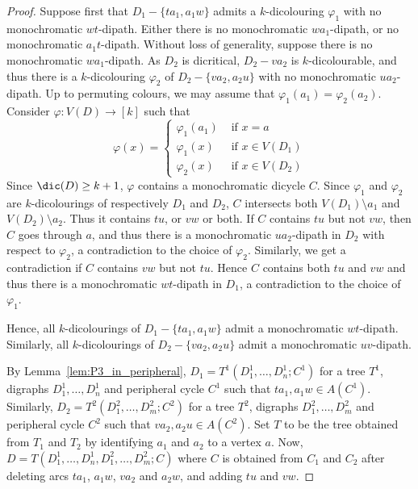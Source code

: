 \begin{proof}
        Suppose first that $D_1 -\{ta_1, a_1w\}$ admits a $k$-dicolouring $\varphi_1$ with no monochromatic $wt$-dipath.
        Either there is no monochromatic $wa_1$-dipath, or no monochromatic $a_1t$-dipath. Without loss of generality, suppose there is no monochromatic $wa_1$-dipath.
        As $D_2$ is dicritical, $D_2 - va_2$ is $k$-dicolourable, and thus there is a $k$-dicolouring $\varphi_2$ of $D_2- \{va_2, a_2u\}$ with no monochromatic $ua_2$-dipath. Up to permuting colours, we may assume that $\varphi_1(a_1) = \varphi_2(a_2)$. 
        Consider $\varphi:V(D) \rightarrow [k]$ such that           
        $$
        \varphi(x) = \left\{
            \begin{array}{ll}
                \varphi_1(a_1) & \text{ if } x=a \\
                \varphi_1(x)   & \text{ if } x \in V(D_1)\\ 
                \varphi_2(x)   & \text{ if } x \in V(D_2)
            \end{array}
        \right.
        $$  
        Since $\dic(D) \geq k+1$, $\varphi$ contains a monochromatic dicycle $C$. Since $\varphi_1$ and $\varphi_2$ are $k$-dicolourings of respectively $D_1$ and $D_2$, $C$ intersects both $V(D_1) \setminus a_1$ and $V(D_2) \setminus a_2$. Thus it contains $tu$, or $vw$ or both. 
        If $C$ contains $tu$ but not $vw$, then $C$ goes through $a$, and thus there is a monochromatic $ua_2$-dipath in $D_2$ with respect to $\varphi_2$, a contradiction to the choice of $\varphi_2$. 
        Similarly, we get a contradiction if $C$ contains $vw$ but not $tu$. 
        Hence $C$ contains both $tu$ and $vw$ and thus there is a monochromatic $wt$-dipath in $D_1$, a contradiction to the choice of $\varphi_1$.

        Hence, all $k$-dicolourings of $D_1-\{ta_1,a_1w\}$ admit a monochromatic $wt$-dipath. Similarly, all $k$-dicolourings of $D_2-\{va_2,a_2u\}$ admit a monochromatic $uv$-dipath.
        
        By Lemma~\ref{lem:P3_in_peripheral}, $D_1=T^1(D^1_1, \dots, D^1_n;C^1)$ for a tree $T^1$,   digraphs $D^1_1, \dots, D^1_n$ and peripheral cycle $C^1$ such that $ta_1, a_1w \in A(C^1)$. Similarly, $D_2=T^2(D^2_1, \dots, D^2_m;C^2)$ for a tree $T^2$,   digraphs $D^2_1, \dots, D^2_m$ and peripheral cycle $C^2$ such that $va_2, a_2u \in A(C^2)$. 
        Set $T$ to be the tree obtained from $T_1$ and $T_2$ by identifying $a_1$ and $a_2$ to a vertex $a$. Now, $D = T(D^1_1, \dots, D^1_n, D^2_1, \dots, D^2_m;C)$ where $C$ is obtained from $C_1$ and $C_2$ after deleting arcs $ta_1$, $a_1w$, $va_2$ and $a_2w$, and adding $tu$ and $vw$. %


\end{proof}
